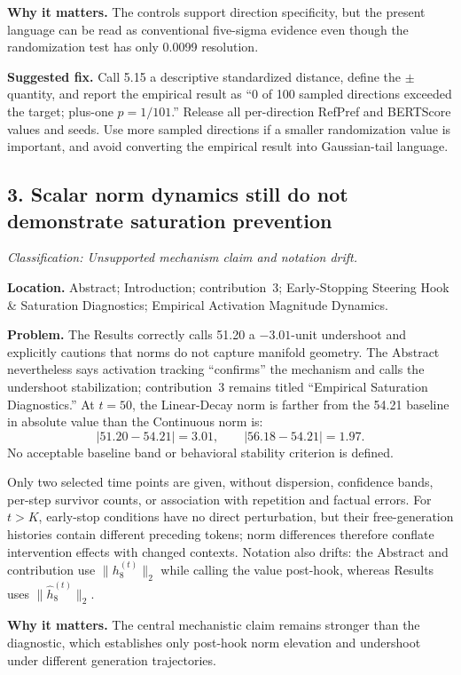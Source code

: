 \documentclass[11pt]{article}
\newcommand{\findinglabel}[1]{\textbf{#1}}
\newcommand{\classification}[1]{\textit{Classification: #1.}}
\begin{document}
\findinglabel{Why it matters.} The controls support direction specificity, but the present language can be read as conventional five-sigma evidence even though the randomization test has only 0.0099 resolution.

\findinglabel{Suggested fix.} Call 5.15 a descriptive standardized distance, define the $\pm$ quantity, and report the empirical result as ``0 of 100 sampled directions exceeded the target; plus-one $p=1/101$.''  Release all per-direction RefPref and BERTScore values and seeds.  Use more sampled directions if a smaller randomization value is important, and avoid converting the empirical result into Gaussian-tail language.

\subsection*{3. Scalar norm dynamics still do not demonstrate saturation prevention}

\classification{Unsupported mechanism claim and notation drift}

\findinglabel{Location.} Abstract; Introduction; contribution~3; Early-Stopping Steering Hook \& Saturation Diagnostics; Empirical Activation Magnitude Dynamics.

\findinglabel{Problem.} The Results correctly calls 51.20 a $-3.01$-unit undershoot and explicitly cautions that norms do not capture manifold geometry.  The Abstract nevertheless says activation tracking ``confirms'' the mechanism and calls the undershoot stabilization; contribution~3 remains titled ``Empirical Saturation Diagnostics.''  At $t=50$, the Linear-Decay norm is farther from the 54.21 baseline in absolute value than the Continuous norm is:
\[
|51.20-54.21|=3.01,
\qquad
|56.18-54.21|=1.97.
\]
No acceptable baseline band or behavioral stability criterion is defined.

Only two selected time points are given, without dispersion, confidence bands, per-step survivor counts, or association with repetition and factual errors.  For $t>K$, early-stop conditions have no direct perturbation, but their free-generation histories contain different preceding tokens; norm differences therefore conflate intervention effects with changed contexts.  Notation also drifts: the Abstract and contribution use $\|h_8^{(t)}\|_2$ while calling the value post-hook, whereas Results uses $\|\hat h_8^{(t)}\|_2$.

\findinglabel{Why it matters.} The central mechanistic claim remains stronger than the diagnostic, which establishes only post-hook norm elevation and undershoot under different generation trajectories.
\end{document}
